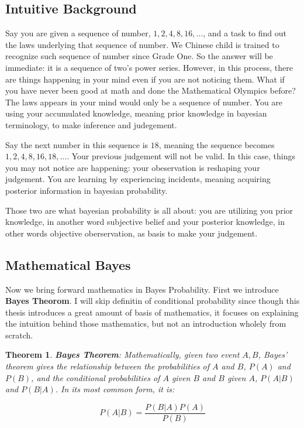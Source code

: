 \documentclass[a4paper]{book}
\newtheorem{theorem}{Theorem}[section]
\begin{document}
    \subsection{Intuitive Background}
    Say you are given a sequence of number, $1, 2, 4, 8, 16, \ldots$,
    and a task to find out the laws underlying that sequence of number.
    We Chinese child is trained to recognize such sequence of number
    since Grade One. So the answer will be immediate: it is a sequence
    of two's power series. However, in this process, there are things
    happening in your mind even if you are not noticing them. What if
    you have never been good at math and done the Mathematical Olympics
    before? The laws appears in your mind would only be a sequence of
    number. You are using your accumulated knowledge, meaning prior
    knowledge in bayesian terminology, to make inference and judegement.

    Say the next number in this sequence is $18$, meaning the sequence
    becomes $1, 2, 4, 8, 16, 18, \ldots$. Your previous judgement will
    not be valid. In this case, things you may not notice are happening:
    your obeservation is reshaping your judgement. You are learning by
    experiencing incidents, meaning acquiring posterior information in
    bayesian probability.

    Those two are what bayesian probability is all about: you are
    utilizing you prior knowledge, in another word subjective belief and
    your posterior knowledge, in other words objective oberservation, as
    basis to make your judgement.

    \subsection{Mathematical Bayes}

    Now we bring forward mathematics in Bayes Probability. First we
    introduce \textbf{Bayes Theorom}. I will skip definitin of
    conditional probability since though this thesis introduces a great
    amount of basis of mathematics, it focuses on explaining the
    intuition behind those mathematics, but not an introduction wholely
    from scratch.

    \begin{theorem}
      \textbf{Bayes Theorem\cite{wiki_bayes_theorem}}: Mathematically,
      given two event $A, B$, Bayes' theorem gives the relationship
      between the probabilities of $A$ and $B$, $P(A)$ and $P(B)$, and
      the conditional probabilities of $A$ given $B$ and $B$ given $A$,
      $P(A|B)$ and $P(B|A)$. In its most common form, it is:

      \begin{displaymath}
        P(A|B) = \frac{P(B|A)P(A)}{P(B)}
      \end{displaymath}
    \end{theorem}
\end{document}
